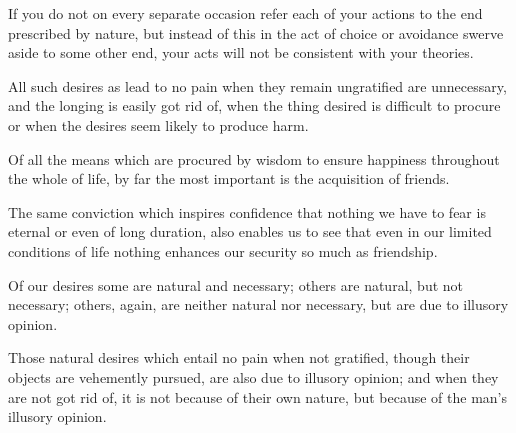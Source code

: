\documentclass{stex}
\begin{document}
\vspace{0.5em}
\begin{sparagraph}[title=25]
  If you do not on every separate occasion refer each of your actions to the end prescribed by nature, but instead of this in the act of choice or avoidance swerve aside to some other end, your acts will not be consistent with your theories.
\end{sparagraph}

\vspace{0.5em}
\begin{sparagraph}[title=26]
  All such desires as lead to no pain when they remain ungratified are unnecessary, and the longing is easily got rid of, when the thing desired is difficult to procure or when the desires seem likely to produce harm.
\end{sparagraph}

\vspace{0.5em}
\begin{sparagraph}[title=27]
  Of all the means which are procured by wisdom to ensure happiness throughout the whole of life, by far the most important is the acquisition of friends.
\end{sparagraph}

\vspace{0.5em}
\begin{sparagraph}[title=28]
  The same conviction which inspires confidence that nothing we have to fear is eternal or even of long duration, also enables us to see that even in our limited conditions of life nothing enhances our security so much as friendship.
\end{sparagraph}

\vspace{0.5em}
\begin{sparagraph}[title=29]
  Of our desires some are natural and necessary; others are natural, but not necessary; others, again, are neither natural nor necessary, but are due to illusory opinion.
\end{sparagraph}

\vspace{0.5em}
\begin{sparagraph}[title=30]
  Those natural desires which entail no pain when not gratified, though their objects are vehemently pursued, are also due to illusory opinion; and when they are not got rid of, it is not because of their own nature, but because of the man's illusory opinion.
\end{sparagraph}
\end{document}
